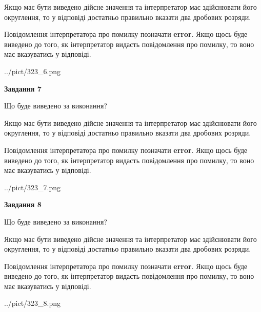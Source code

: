 \documentclass[12pt, ukrainian]{article}
\begin{document}
{\begin {Large}
Якщо має бути виведено дійсне значення та інтерпретатор має здійснювати його округлення, 
то у відповіді достатньо правильно вказати два дробових розряди.

Повідомлення інтерпретатора про помилку позначати \textbf{error}.
Якщо щось буде виведено до того, як інтерпретатор видасть повідомлення про помилку, 
то воно має вказуватись у відповіді. \par

\begin{center}
	{../pict/323_6.png}
\end{center}
\newpage

{\begin {center}\textbf{Завдання 7}\end {center}}\par
Що буде виведено за виконання? \par

Якщо має бути виведено дійсне значення та інтерпретатор має здійснювати його округлення, 
то у відповіді достатньо правильно вказати два дробових розряди.

Повідомлення інтерпретатора про помилку позначати \textbf{error}.
Якщо щось буде виведено до того, як інтерпретатор видасть повідомлення про помилку, 
то воно має вказуватись у відповіді. \par

\begin{center}
	{../pict/323_7.png}
\end{center}
\newpage

{\begin {center}\textbf{Завдання 8}\end {center}}\par
Що буде виведено за виконання? \par

Якщо має бути виведено дійсне значення та інтерпретатор має здійснювати його округлення, 
то у відповіді достатньо правильно вказати два дробових розряди.

Повідомлення інтерпретатора про помилку позначати \textbf{error}.
Якщо щось буде виведено до того, як інтерпретатор видасть повідомлення про помилку, 
то воно має вказуватись у відповіді. \par

\begin{center}
	{../pict/323_8.png}
\end{center}
\newpage


\end{Large}}
\end{document}
